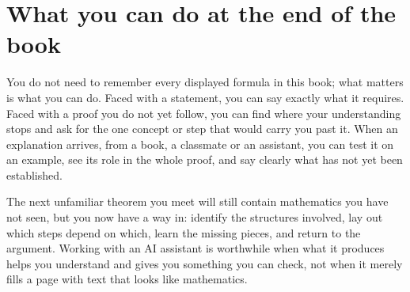 \section{What you can do at the end of the book}\label{appC:sec:finishing}
You do not need to remember every displayed formula in this book; what matters is what you can do. Faced with a statement, you can say exactly what it requires. Faced with a proof you do not yet follow, you can find where your understanding stops and ask for the one concept or step that would carry you past it. When an explanation arrives, from a book, a classmate or an assistant, you can test it on an example, see its role in the whole proof, and say clearly what has not yet been established.

The next unfamiliar theorem you meet will still contain mathematics you have not seen, but you now have a way in: identify the structures involved, lay out which steps depend on which, learn the missing pieces, and return to the argument. Working with an AI assistant is worthwhile when what it produces helps you understand and gives you something you can check, not when it merely fills a page with text that looks like mathematics.
